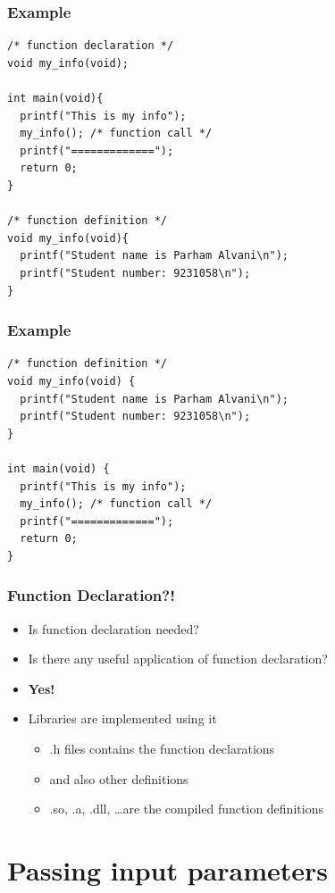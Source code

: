 \documentclass{../c-lecture}
\begin{document}
\begin{frame}[fragile]
  \frametitle{Example}
  \scriptsize
  \begin{verbatim}
/* function declaration */
void my_info(void);

int main(void){
  printf("This is my info");
  my_info(); /* function call */
  printf("=============");
  return 0;
}

/* function definition */
void my_info(void){
  printf("Student name is Parham Alvani\n");
  printf("Student number: 9231058\n");
}
  \end{verbatim}
\end{frame}

\begin{frame}[fragile]
  \frametitle{Example}
  \scriptsize
  \begin{verbatim}
/* function definition */
void my_info(void) {
  printf("Student name is Parham Alvani\n");
  printf("Student number: 9231058\n");
}

int main(void) {
  printf("This is my info");
  my_info(); /* function call */
  printf("=============");
  return 0;
}
  \end{verbatim}
\end{frame}

\begin{frame}
  \frametitle{Function Declaration?!}
  \begin{itemize}
    \item Is function declaration needed?
    \item Is there any useful application of function declaration?
    \item \textbf{\color{Orange} Yes!}
    \item Libraries are implemented using it
    \begin{itemize}
      \item .h files contains the function declarations
      \item and also other definitions
      \item .so, .a, .dll, \ldots are the compiled function definitions
    \end{itemize}
  \end{itemize}
\end{frame}

\section{Passing input parameters}
\end{document}
